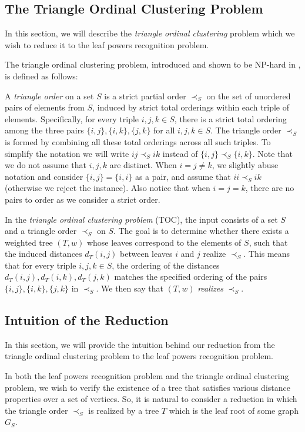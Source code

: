 \documentclass[11pt, letter]{article}
\theoremstyle{remark}
\begin{document}
\subsection{The Triangle Ordinal Clustering Problem}

In this section, we will describe the \emph{triangle ordinal clustering} problem which we wish to reduce it to the leaf powers recognition problem. 

The triangle ordinal clustering problem, introduced and shown to be NP-hard in \cite{SF06}, is defined as follows:

A \emph{triangle order} on a set $S$ is a strict partial order $\prec_S$ on the set of unordered pairs of elements from $S$, induced by strict total orderings within each triple of elements.  Specifically, for every triple $i,j,k\in S$, there is a strict total ordering among the three pairs $\{i,j\}, \{i,k\}, \{j,k\}$ for all $i, j, k \in S$. The triangle order $\prec_S$ is formed by combining all these total orderings across all such triples. To simplify the notation we will write $ij \prec_S ik$ instead of $\{i,j\} \prec_S \{i,k\}$.  Note that we do not assume that $i, j, k$ are distinct.  When $i = j \neq k$, we slightly abuse notation and consider $\{i, j\} = \{i, i\}$ as a pair, and assume that $i i \prec_S i k$ (otherwise we reject the instance).  Also notice that when $i = j = k$, there are no pairs to order as we consider a strict order. 

In the \emph{triangle ordinal clustering problem} (TOC), the input consists of a set $ S $ and a triangle order $ \prec_S $ on $ S $. The goal is to determine whether there exists a weighted tree $ (T, w) $ whose leaves correspond to the elements of $ S $, such that the induced distances $ d_T(i, j) $ between leaves $ i $ and $ j $ realize $ \prec_S $. This means that for every triple $ i, j, k \in S $, the ordering of the distances $ d_T(i, j), d_T(i, k), d_T(j, k) $ matches the specified ordering of the pairs $ \{i, j\}, \{i, k\}, \{j, k\} $ in $ \prec_S $.
We then say that $(T, w)$ \emph{realizes} $\prec_S$.
\subsection{Intuition of the Reduction}

In this section, we will provide the intuition behind our reduction from the triangle ordinal clustering problem to the leaf powers recognition problem.

In both the leaf powers recognition problem and the triangle ordinal clustering problem, we wish to verify the existence of a tree that satisfies various distance properties over a set of vertices. So, it is natural to consider a reduction in which the triangle order $\prec_S$ is realized by a tree $T$ which is the leaf root of some graph $G_S$.
\end{document}
